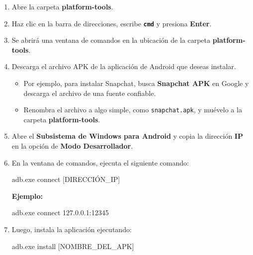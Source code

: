 \documentclass[
  doc,
  floatsintext,
  longtable,
  a4paper,
  nolmodern,
  notxfonts,
  notimes,
  12pt,
  colorlinks=true,linkcolor=blue,citecolor=blue,urlcolor=blue]{apa7}
\newenvironment{Shaded}{\begin{snugshade}}{\end{snugshade}}
\newcommand{\ExtensionTok}[1]{\textcolor[rgb]{0.00,0.23,0.31}{#1}}
\newcommand{\NormalTok}[1]{\textcolor[rgb]{0.00,0.23,0.31}{#1}}
\newcommand{\PreprocessorTok}[1]{\textcolor[rgb]{0.68,0.00,0.00}{#1}}
\newcommand{\SpecialStringTok}[1]{\textcolor[rgb]{0.13,0.47,0.30}{#1}}
\providecommand{\tightlist}{%
  \setlength{\itemsep}{0pt}\setlength{\parskip}{0pt}}
\begin{document}
\begin{enumerate}
\def\labelenumi{\arabic{enumi}.}
\item
  Abre la carpeta \textbf{platform-tools}.
\item
  Haz clic en la barra de direcciones, escribe \textbf{\texttt{cmd}} y
  presiona \textbf{Enter}.
\item
  Se abrirá una ventana de comandos en la ubicación de la carpeta
  \textbf{platform-tools}.
\item
  Descarga el archivo APK de la aplicación de Android que deseas
  instalar.

  \begin{itemize}
  \tightlist
  \item
    Por ejemplo, para instalar Snapchat, busca \textbf{Snapchat APK} en
    Google y descarga el archivo de una fuente confiable.
  \item
    Renombra el archivo a algo simple, como \texttt{snapchat.apk}, y
    muévelo a la carpeta \textbf{platform-tools}.
  \end{itemize}
\item
  Abre el \textbf{Subsistema de Windows para Android} y copia la
  dirección \textbf{IP} en la opción de \textbf{Modo Desarrollador}.
\item
  En la ventana de comandos, ejecuta el siguiente comando:

\begin{Shaded}
\begin{Highlighting}[]
\ExtensionTok{adb.exe}\NormalTok{ connect }\PreprocessorTok{[}\SpecialStringTok{DIRECCIÓN\_IP}\PreprocessorTok{]}
\end{Highlighting}
\end{Shaded}

  \textbf{Ejemplo:}

\begin{Shaded}
\begin{Highlighting}[]
\ExtensionTok{adb.exe}\NormalTok{ connect 127.0.0.1:12345}
\end{Highlighting}
\end{Shaded}
\item
  Luego, instala la aplicación ejecutando:

\begin{Shaded}
\begin{Highlighting}[]
\ExtensionTok{adb.exe}\NormalTok{ install }\PreprocessorTok{[}\SpecialStringTok{NOMBRE\_DEL\_APK}\PreprocessorTok{]}
\end{Highlighting}
\end{Shaded}


\end{enumerate}
\end{document}
